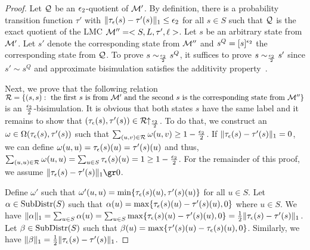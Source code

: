 \begin{proof}
	Let $\mathcal{Q}$ be an $\epsilon_2$-quotient of $\mathcal{M}'$. By definition, there is a probability transition function $\tau'$ with $\|\tau_{\epsilon}(s) - \tau'(s)\|_1 \le \epsilon_2$ for all $s\in S$ such that $\mathcal{Q}$ is the exact quotient of the LMC $\mathcal{M}'' = <S, L, \tau', \ell>$. Let $s$ be an arbitrary state from $\mathcal{M}'$. Let $s'$ denote the corresponding state from $\mathcal{M}''$ and $s^{Q} = [s]^{\epsilon_2}$ the corresponding state from $\mathcal{Q}$.  To prove $s \sim_{\frac{\epsilon_2}{2}} s^{Q}$, it suffices to prove $s \sim_{\frac{\epsilon_2}{2}} s'$ since $s' \sim s^{Q}$ and approximate bisimulation satisfies the additivity property~\cite{DesharnaisLavoletteTracol2008}.  
	
	Next, we prove that the following relation $\mathcal{R} = \{(s, s) : \text{ the first } s \text{ is from } \mathcal{M}' \text{ and the second } s \text{ is the corresponding state from } \mathcal{M}''\}$ is an $\frac{\epsilon_2}{2}$-bisimulation. It is obvious that both states $s$ have the same label and it remains to show that $(\tau_{\epsilon}(s), \tau'(s)) \in \mathord{\mathcal{R}\!\!\uparrow}_{\frac{\epsilon_2}{2}}$. To do that, we construct an $\omega \in \Omega(\tau_{\epsilon}(s), \tau'(s))$ such that $\sum_{(u, v) \in \mathcal{R}} \omega(u, v) \ge 1 -\frac{\epsilon_2}{2}$. If $\|\tau_{\epsilon}(s) - \tau'(s)\|_1 = 0$, we can define $\omega(u, u) = \tau_{\epsilon}(s)(u) = \tau'(s)(u)$ and thus, $\sum_{(u, u) \in \mathcal{R}} \omega(u, u) = \sum_{u \in S}\tau_{\epsilon}(s)(u) = 1 \ge 1 -\frac{\epsilon_2}{2}$. For the remainder of this proof, we assume $\|\tauHyp(s) - \tau'(s)\|_1 \gr 0$.
	
	Define $\omega'$ such that $\omega'(u, u) = \min\{\tau_{\epsilon}(s)(u), \tau'(s)(u)\}$ for all $u \in S$. Let $\alpha \in \mathrm{SubDistr}(S)$ such that $\alpha(u) = \max\{\tau_{\epsilon}(s)(u)-\tau'(s)(u) ,0\}$ where $u \in S$. We have $\|\alpha\|_1 = \sum_{u \in S} \alpha(u) = \sum_{u \in S}  \max\{\tau_{\epsilon}(s)(u)-\tau'(s)(u), 0\} =\frac{1}{2} \|\tau_{\epsilon}(s)-\tau'(s)\|_1$. Let $\beta \in \mathrm{SubDistr}(S)$ such that $\beta(u) = \max\{\tau'(s)(u)-\tau_{\epsilon}(s)(u) ,0\}$. Similarly, we have $\|\beta\|_1 = \frac{1}{2} \|\tau_{\epsilon}(s)-\tau'(s)\|_1$.
	

\end{proof}
